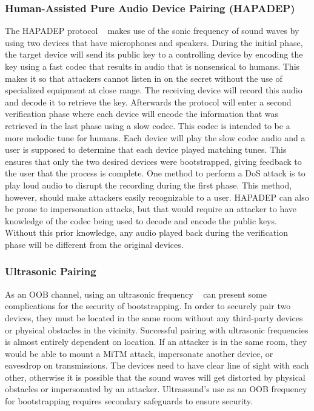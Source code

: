 \subsubsection{Human-Assisted Pure Audio Device Pairing (HAPADEP)}
The HAPADEP protocol ~\cite{soriente2008hapadep} makes use of the sonic frequency of sound waves by using two devices that have microphones and speakers. During the initial phase, the target device will send its public key to a controlling device by encoding the key using a fast codec that results in audio that is nonsensical to humans. This makes it so that attackers cannot listen in on the secret without the use of specialized equipment at close range. The receiving device will record this audio and decode it to retrieve the key. Afterwards the protocol will enter a second verification phase where each device will encode the information that was retrieved in the last phase using a slow codec. This codec is intended to be a more melodic tune for humans. Each device will play the slow codec audio and a user is supposed to determine that each device played matching tunes. This ensures that only the two desired devices were bootstrapped, giving feedback to the user that the process is complete. One method to perform a DoS attack is to play loud audio to disrupt the recording during the first phase. This method, however, should make attackers easily recognizable to a user. HAPADEP can also be prone to impersonation attacks, but that would require an attacker to have knowledge of the codec being used to decode and encode the public keys. Without this prior knowledge, any audio played back during the verification phase will be different from the original devices.

\subsubsection{Ultrasonic Pairing}
As an OOB channel, using an ultrasonic frequency ~\cite{mayrhofer2007security} can present some complications for the security of bootstrapping. In order to securely pair two devices, they must be located in the same room without any third-party devices or physical obstacles in the vicinity. Successful pairing with ultrasonic frequencies is almost entirely dependent on location. If an attacker is in the same room, they would be able to mount a MiTM attack, impersonate another device, or eavesdrop on transmissions. The devices need to have clear line of sight with each other, otherwise it is possible that the sound waves will get distorted by physical obstacles or impersonated by an attacker. Ultrasound’s use as an OOB frequency for bootstrapping requires secondary safeguards to ensure security.


